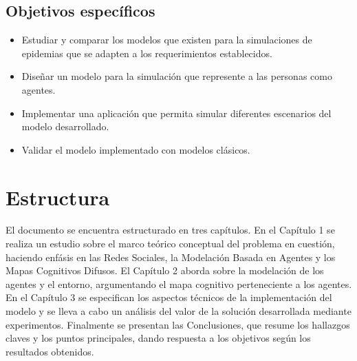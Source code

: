 \subsection{Objetivos específicos}
\begin{itemize}
    \item Estudiar y comparar los modelos que existen para la simulaciones de epidemias que se adapten a los requerimientos establecidos.
    \item Diseñar un modelo para la simulación que represente a las personas como agentes.
    \item Implementar una aplicación que permita simular diferentes escenarios del modelo desarrollado.
    \item Validar el modelo implementado con modelos clásicos.
\end{itemize}


\section{Estructura}
El documento se encuentra estructurado en tres capítulos. En el Capítulo 1 
se realiza un estudio sobre el marco teórico conceptual del problema en cuestión, haciendo enfásis en 
las Redes Sociales, la Modelación Basada en Agentes y los Mapas Cognitivos Difusos. El Capítulo 2 aborda sobre
la modelación de los agentes y el entorno, argumentando el mapa cognitivo perteneciente a los agentes. En el 
Capítulo 3 se especifican los aspectos técnicos de la implementación del modelo y se lleva a cabo un 
análisis del valor de la solución desarrollada mediante experimentos. Finalmente se presentan las Conclusiones,
que resume los hallazgos claves y los puntos principales, dando respuesta a los objetivos según los resultados obtenidos.





